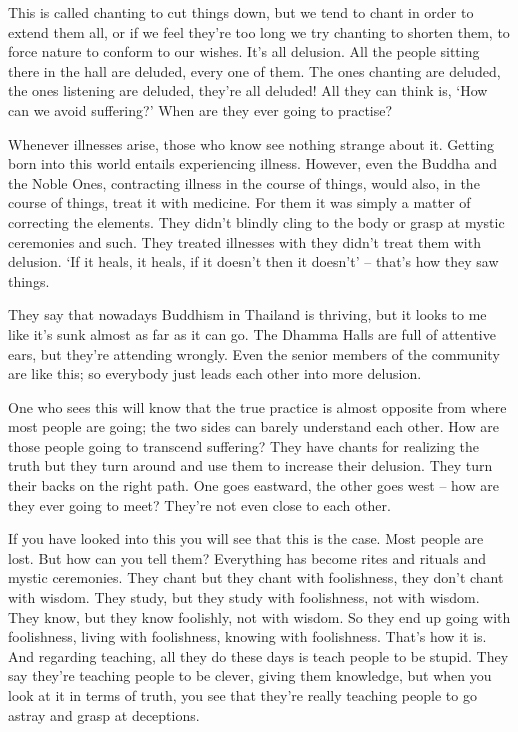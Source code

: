 This is called chanting to cut things down, but we tend to chant in order to extend them all, or if we feel they're too long we try chanting to shorten them, to force nature to conform to our wishes. It's all delusion. All the people sitting there in the hall are deluded, every one of them. The ones chanting are deluded, the ones listening are deluded, they're all deluded! All they can think is, `How can we avoid suffering?' When are they ever going to practise? 

Whenever illnesses arise, those who know see nothing strange about it. Getting born into this world entails experiencing illness. However, even the Buddha and the Noble Ones, contracting illness in the course of things, would also, in the course of things, treat it with medicine. For them it was simply a matter of correcting the elements. They didn't blindly cling to the body or grasp at mystic ceremonies and such. They treated illnesses with  they didn't treat them with delusion. `If it heals, it heals, if it doesn't then it doesn't' -- that's how they saw things.

They say that nowadays Buddhism in Thailand is thriving, but it looks to me like it's sunk almost as far as it can go. The Dhamma Halls are full of attentive ears, but they're attending wrongly. Even the senior members of the community are like this; so everybody just leads each other into more delusion. 

One who sees this will know that the true practice is almost opposite from where most people are going; the two sides can barely understand each other. How are those people going to transcend suffering? They have chants for realizing the truth but they turn around and use them to increase their delusion. They turn their backs on the right path. One goes eastward, the other goes west -- how are they ever going to meet? They're not even close to each other. 

If you have looked into this you will see that this is the case. Most people are lost. But how can you tell them? Everything has become rites and rituals and mystic ceremonies. They chant but they chant with foolishness, they don't chant with wisdom. They study, but they study with foolishness, not with wisdom. They know, but they know foolishly, not with wisdom. So they end up going with foolishness, living with foolishness, knowing with foolishness. That's how it is. And regarding teaching, all they do these days is teach people to be stupid. They say they're teaching people to be clever, giving them knowledge, but when you look at it in terms of truth, you see that they're really teaching people to go astray and grasp at deceptions. 

